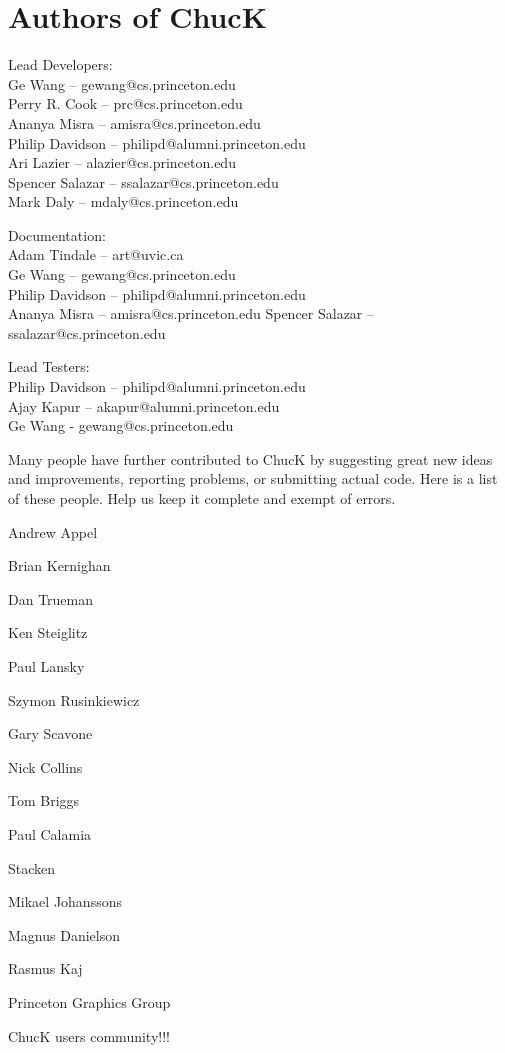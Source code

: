 \newpage
\section{Authors of ChucK}

Lead Developers:\\
\authtab Ge Wang -- gewang@cs.princeton.edu\\
\authtab Perry R. Cook -- prc@cs.princeton.edu\\
\authtab Ananya Misra -- amisra@cs.princeton.edu\\
\authtab Philip Davidson -- philipd@alumni.princeton.edu\\
\authtab Ari Lazier -- alazier@cs.princeton.edu\\
\authtab Spencer Salazar -- ssalazar@cs.princeton.edu\\
\authtab Mark Daly -- mdaly@cs.princeton.edu

Documentation:\\
\authtab Adam Tindale -- art@uvic.ca\\
\authtab Ge Wang -- gewang@cs.princeton.edu\\
\authtab Philip Davidson -- philipd@alumni.princeton.edu\\
\authtab Ananya Misra -- amisra@cs.princeton.edu
\authtab Spencer Salazar -- ssalazar@cs.princeton.edu

Lead Testers:\\
\authtab Philip Davidson -- philipd@alumni.princeton.edu\\
\authtab Ajay Kapur -- akapur@alumni.princeton.edu\\
\authtab Ge Wang - gewang@cs.princeton.edu


Many people have further contributed to ChucK by suggesting great new 
ideas and improvements, reporting problems, or submitting actual code. 
Here is a list of these people.  Help us keep it complete and exempt of 
errors.

\begin{chuckitemize}
\item Andrew Appel 
\item Brian Kernighan 
\item Dan Trueman 
\item Ken Steiglitz 
\item Paul Lansky 
\item Szymon Rusinkiewicz 
\item Gary Scavone 
\item Nick Collins 
\item Tom Briggs 
\item Paul Calamia 
\item Stacken 
  \begin{chuckitemize}
  \item Mikael Johanssons 
  \item Magnus Danielson 
  \item Rasmus Kaj 
  \end{chuckitemize}
\item Princeton Graphics Group
\item ChucK users community!!!
\end{chuckitemize}
